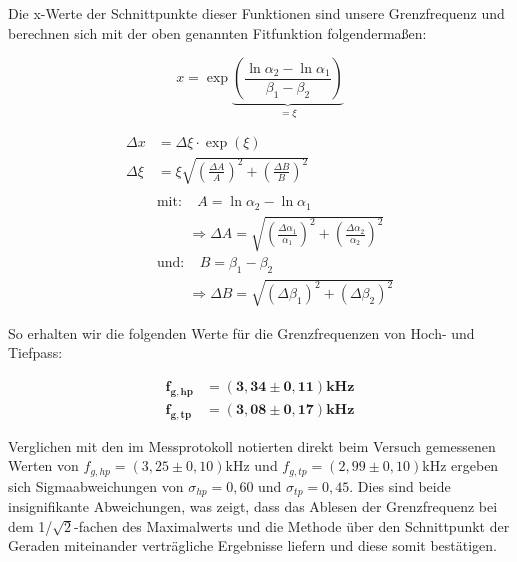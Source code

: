 \documentclass{article}
\begin{document}
Die x-Werte der Schnittpunkte dieser Funktionen sind unsere Grenzfrequenz und berechnen sich mit der oben genannten Fitfunktion folgendermaßen:

\begin{equation}
    x = \exp{ \underbrace{ \left( \frac{\ln \alpha_2 - \ln \alpha_1}{\beta_1 - \beta_2} \right) }_{= \xi}}
\end{equation}

\begin{equation}
    \begin{split}
        \Delta x &= \Delta \xi \cdot \exp{(\xi)} \\
        \Delta \xi &= \xi \sqrt{\left( \frac{\Delta A}{A} \right)^2 + \left(  \frac{\Delta B}{B}  \right)^2} \\ \\
        &\text{mit:} \ \ \ \ \ A = \ln \alpha_2 - \ln \alpha_1 \\
        &\phantom{mit:} \ \Rightarrow \Delta A = \sqrt{\left( \frac{\Delta \alpha_1}{\alpha_1} \right)^2 + \left( \frac{\Delta \alpha_2}{\alpha_2} \right)^2} \\
        &\text{und:} \ \ \ \ \ B = \beta_1 - \beta_2 \\
        &\phantom{mit:} \ \Rightarrow \Delta B = \sqrt{(\Delta \beta_1)^2 + (\Delta \beta_2)^2}
    \end{split}
\end{equation}

So erhalten wir die folgenden Werte für die Grenzfrequenzen von Hoch- und Tiefpass:

\begin{equation}
    \begin{split}
        \bm{f_{g,hp}} &= \bm{(3,34 \pm 0,11)} \textbf{kHz} \\
        \bm{f_{g,tp}} &= \bm{(3,08 \pm 0,17)} \textbf{kHz}
    \end{split}
\end{equation}

Verglichen mit den im Messprotokoll notierten direkt beim Versuch gemessenen Werten von $f_{g,hp} = (3,25 \pm 0,10)$kHz und $f_{g,tp} = (2,99 \pm 0,10)$kHz ergeben sich Sigmaabweichungen von $\sigma_{hp} = 0,60$ und $\sigma_{tp} = 0,45$. Dies sind beide insignifikante Abweichungen, was zeigt, dass das Ablesen der Grenzfrequenz bei dem 1/$\sqrt{2}$-fachen des Maximalwerts und die Methode über den Schnittpunkt der Geraden miteinander verträgliche Ergebnisse liefern und diese somit bestätigen. 
\end{document}
